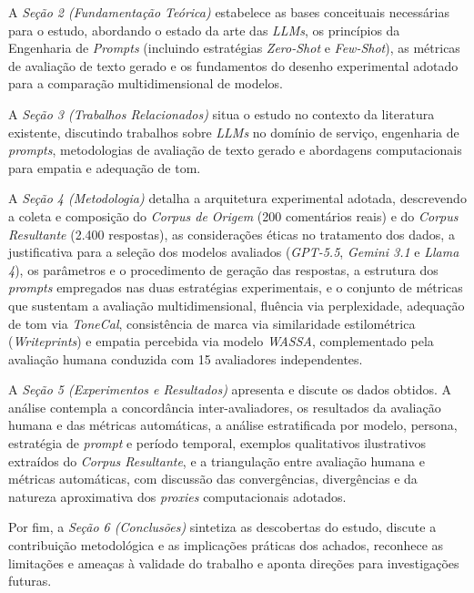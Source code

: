 \documentclass[12pt, a4paper]{article}
\numberwithin{equation}{section}
\begin{document}
A \textit{Seção 2 (Fundamentação Teórica)} estabelece as bases conceituais necessárias para o estudo, abordando o estado da arte das \textit{LLMs}, os princípios da Engenharia de \textit{Prompts} (incluindo estratégias \textit{Zero-Shot} e \textit{Few-Shot}), as métricas de avaliação de texto gerado e os fundamentos do desenho experimental adotado para a comparação multidimensional de modelos.

A \textit{Seção 3 (Trabalhos Relacionados)} situa o estudo no contexto da literatura existente, discutindo trabalhos sobre \textit{LLMs} no domínio de serviço, engenharia de \textit{prompts}, metodologias de avaliação de texto gerado e abordagens computacionais para empatia e adequação de tom.

A \textit{Seção 4 (Metodologia)} detalha a arquitetura experimental adotada, descrevendo a coleta e composição do \textit{Corpus de Origem} (200 comentários reais) e do \textit{Corpus Resultante} (2.400 respostas), as considerações éticas no tratamento dos dados, a justificativa para a seleção dos modelos avaliados (\textit{GPT-5.5}, \textit{Gemini 3.1} e \textit{Llama 4}), os parâmetros e o procedimento de geração das respostas, a estrutura dos \textit{prompts} empregados nas duas estratégias experimentais, e o conjunto de métricas que sustentam a avaliação multidimensional, fluência via perplexidade, adequação de tom via \textit{ToneCal}, consistência de marca via similaridade estilométrica (\textit{Writeprints}) e empatia percebida via modelo \textit{WASSA}, complementado pela avaliação humana conduzida com 15 avaliadores independentes.

A \textit{Seção 5 (Experimentos e Resultados)} apresenta e discute os dados obtidos. A análise contempla a concordância inter-avaliadores, os resultados da avaliação humana e das métricas automáticas, a análise estratificada por modelo, persona, estratégia de \textit{prompt} e período temporal, exemplos qualitativos ilustrativos extraídos do \textit{Corpus Resultante}, e a triangulação entre avaliação humana e métricas automáticas, com discussão das convergências, divergências e da natureza aproximativa dos \textit{proxies} computacionais adotados.

Por fim, a \textit{Seção 6 (Conclusões)} sintetiza as descobertas do estudo, discute a contribuição metodológica e as implicações práticas dos achados, reconhece as limitações e ameaças à validade do trabalho e aponta direções para investigações futuras.

\newpage
\end{document}
